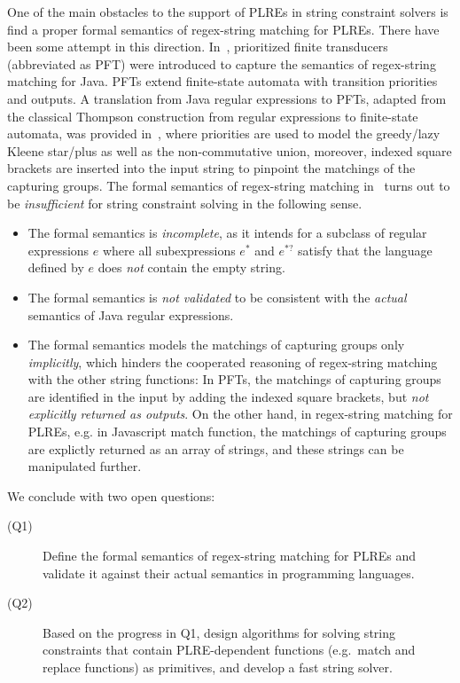 {One of the main obstacles to the support of PLREs in string constraint solvers is find a proper formal semantics of regex-string matching for PLREs. There have been some attempt in this direction. In~\cite{BDM14,BM17}, prioritized finite transducers (abbreviated as PFT) were introduced to capture the semantics of regex-string matching for Java.  PFTs extend finite-state automata with transition priorities and outputs. A translation from Java regular expressions to PFTs, adapted from the classical Thompson construction from regular expressions to finite-state automata, was provided in~\cite{BDM14,BM17}, where priorities are used to model the greedy/lazy Kleene star/plus as well as the non-commutative union, moreover, indexed square brackets are inserted into the input string to pinpoint the matchings of the capturing groups.  The formal semantics of regex-string matching in~\cite{BDM14,BM17} turns out to be \emph{insufficient} for string constraint solving in the following sense.
\begin{itemize}
\item The formal semantics is \emph{incomplete}, as it intends for a subclass of regular expressions $e$ where all subexpressions $e^*$ and $e^{*?}$ satisfy that the language defined by $e$ does \emph{not} contain the empty string. 
%
\item The formal semantics is \emph{not validated} to be consistent with the \emph{actual} semantics of Java regular expressions.
%
\item The formal semantics models the matchings of capturing groups only \emph{implicitly}, which hinders the cooperated reasoning of regex-string matching with the other string functions: In PFTs, the matchings of capturing groups are identified in the input by adding the indexed square brackets, but \emph{not explicitly returned as outputs}.  On the other hand, in regex-string matching for PLREs, e.g. in Javascript match function, the matchings of capturing groups are explictly returned as an array of strings, and these strings can be manipulated further. 
\end{itemize}

We conclude with two open questions:
\begin{description}
    \item[(Q1)] Define the formal semantics of regex-string matching for PLREs and validate it against their actual semantics in programming languages.
    \item[(Q2)] Based on the progress in Q1, design algorithms for solving string constraints that contain PLRE-dependent functions (e.g.\ match and replace functions) as primitives, and develop a 
        fast string solver.
\end{description}

}
